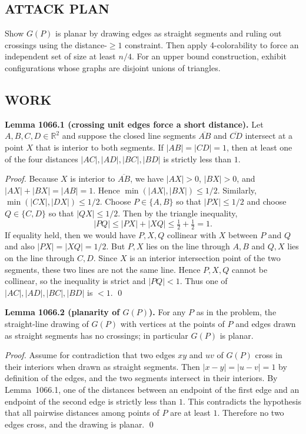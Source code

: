 \subsection*{ATTACK PLAN}
Show $G(P)$ is planar by drawing edges as straight segments and ruling out crossings using the distance-$\ge 1$ constraint.  Then apply 4-colorability to force an independent set of size at least $n/4$.  For an upper bound construction, exhibit configurations whose graphs are disjoint unions of triangles.

\subsection*{WORK}
\textbf{Lemma 1066.1 (crossing unit edges force a short distance).}
Let $A,B,C,D\in\mathbb{R}^2$ and suppose the closed line segments $\overline{AB}$ and $\overline{CD}$ intersect at a point $X$ that is interior to both segments.  If $|AB|=|CD|=1$, then at least one of the four distances $|AC|,|AD|,|BC|,|BD|$ is strictly less than $1$.

\emph{Proof.}
Because $X$ is interior to $\overline{AB}$, we have $|AX|>0$, $|BX|>0$, and $|AX|+|BX|=|AB|=1$. Hence $\min(|AX|,|BX|)\le 1/2$.  Similarly, $\min(|CX|,|DX|)\le 1/2$.
Choose $P\in\{A,B\}$ so that $|PX|\le 1/2$ and choose $Q\in\{C,D\}$ so that $|QX|\le 1/2$.
Then by the triangle inequality,
\[
|PQ| \le |PX|+|XQ| \le \tfrac12+\tfrac12 = 1.
\]
If equality held, then we would have $P,X,Q$ collinear with $X$ between $P$ and $Q$ and also $|PX|=|XQ|=1/2$.  But $P,X$ lies on the line through $A,B$ and $Q,X$ lies on the line through $C,D$.  Since $X$ is an interior intersection point of the two segments, these two lines are not the same line. Hence $P,X,Q$ cannot be collinear, so the inequality is strict and $|PQ|<1$.
Thus one of $|AC|,|AD|,|BC|,|BD|$ is $<1$. \qed

\textbf{Lemma 1066.2 (planarity of $G(P)$).}
For any $P$ as in the problem, the straight-line drawing of $G(P)$ with vertices at the points of $P$ and edges drawn as straight segments has no crossings; in particular $G(P)$ is planar.

\emph{Proof.}
Assume for contradiction that two edges $xy$ and $uv$ of $G(P)$ cross in their interiors when drawn as straight segments. Then $|x-y|=|u-v|=1$ by definition of the edges, and the two segments intersect in their interiors.  By Lemma~1066.1, one of the distances between an endpoint of the first edge and an endpoint of the second edge is strictly less than $1$.  This contradicts the hypothesis that all pairwise distances among points of $P$ are at least $1$.  Therefore no two edges cross, and the drawing is planar. \qed

